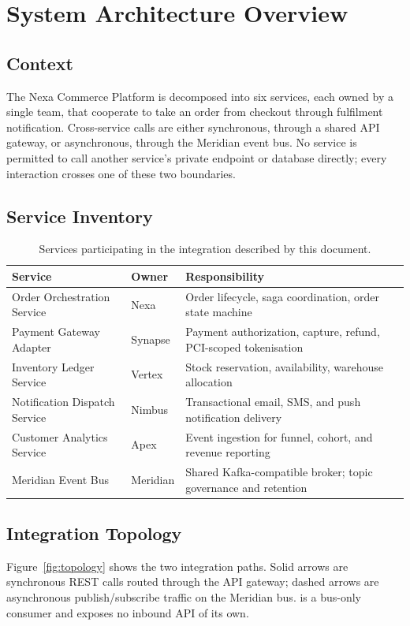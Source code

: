 \section{System Architecture Overview}

\subsection{Context}
The Nexa Commerce Platform is decomposed into six services, each owned by a single team, that
cooperate to take an order from checkout through fulfilment notification. Cross-service calls
are either synchronous, through a shared API gateway, or asynchronous, through the Meridian
event bus. No service is permitted to call another service's private endpoint or database
directly; every interaction crosses one of these two boundaries.

\subsection{Service Inventory}
\begin{table}[h!]
\centering
\small
\begin{tabularx}{\linewidth}{@{}l l X@{}}
\toprule
\textbf{Service} & \textbf{Owner} & \textbf{Responsibility} \\
\midrule
Order Orchestration Service   & Nexa     & Order lifecycle, saga coordination, order state machine \\
Payment Gateway Adapter       & Synapse  & Payment authorization, capture, refund, PCI-scoped tokenisation \\
Inventory Ledger Service      & Vertex   & Stock reservation, availability, warehouse allocation \\
Notification Dispatch Service & Nimbus   & Transactional email, SMS, and push notification delivery \\
Customer Analytics Service    & Apex     & Event ingestion for funnel, cohort, and revenue reporting \\
Meridian Event Bus            & Meridian & Shared Kafka-compatible broker; topic governance and retention \\
\bottomrule
\end{tabularx}
\caption{Services participating in the integration described by this document.}
\end{table}

\subsection{Integration Topology}
Figure~\ref{fig:topology} shows the two integration paths. Solid arrows are synchronous REST
calls routed through the API gateway; dashed arrows are asynchronous publish/subscribe traffic
on the Meridian bus.  is a bus-only consumer and exposes no inbound
API of its own.

